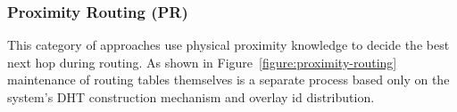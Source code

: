 %
%
%

\subsubsection{Proximity Routing (PR)}


This category of approaches use physical proximity knowledge to decide the best
next hop during routing. As shown in Figure~\ref{figure:proximity-routing}
maintenance of routing tables themselves is a separate process based only on the
system's DHT construction mechanism and overlay id distribution.

